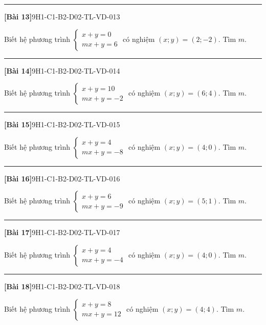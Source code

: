 \documentclass[12pt,a4paper]{article}
\newif\ifloigiai
\newenvironment{cauhoi}[2]{%
  \par\medskip\noindent\rule{\textwidth}{0.4pt}\par\nopagebreak
  \noindent\textbf{[#1]}\hfill{\scriptsize\ttfamily #2}\par\nopagebreak\smallskip}{\par}
\newcommand{\loigiai}[1]{\ifloigiai\par\smallskip\noindent\textit{Lời giải.} #1\par\fi}
\begin{document}
\begin{cauhoi}{Bài 13}{9H1-C1-B2-D02-TL-VD-013}
Biết hệ phương trình $\begin{cases}x+y=0\\ mx+y=6\end{cases}$ có nghiệm $(x;y)=(2;-2)$. Tìm $m$.
\loigiai{Thay $x=2$, $y=-2$ vào phương trình thứ hai: $2 m-2=6$ nên $m=\dfrac{6+2}{2}=4$.}
\end{cauhoi}
\begin{cauhoi}{Bài 14}{9H1-C1-B2-D02-TL-VD-014}
Biết hệ phương trình $\begin{cases}x+y=10\\ mx+y=-2\end{cases}$ có nghiệm $(x;y)=(6;4)$. Tìm $m$.
\loigiai{Thay $x=6$, $y=4$ vào phương trình thứ hai: $6 m+4=-2$ nên $m=\dfrac{-2-4}{6}=-1$.}
\end{cauhoi}
\begin{cauhoi}{Bài 15}{9H1-C1-B2-D02-TL-VD-015}
Biết hệ phương trình $\begin{cases}x+y=4\\ mx+y=-8\end{cases}$ có nghiệm $(x;y)=(4;0)$. Tìm $m$.
\loigiai{Thay $x=4$, $y=0$ vào phương trình thứ hai: $4 m+0=-8$ nên $m=\dfrac{-8-0}{4}=-2$.}
\end{cauhoi}
\begin{cauhoi}{Bài 16}{9H1-C1-B2-D02-TL-VD-016}
Biết hệ phương trình $\begin{cases}x+y=6\\ mx+y=-9\end{cases}$ có nghiệm $(x;y)=(5;1)$. Tìm $m$.
\loigiai{Thay $x=5$, $y=1$ vào phương trình thứ hai: $5 m+1=-9$ nên $m=\dfrac{-9-1}{5}=-2$.}
\end{cauhoi}
\begin{cauhoi}{Bài 17}{9H1-C1-B2-D02-TL-VD-017}
Biết hệ phương trình $\begin{cases}x+y=4\\ mx+y=-4\end{cases}$ có nghiệm $(x;y)=(4;0)$. Tìm $m$.
\loigiai{Thay $x=4$, $y=0$ vào phương trình thứ hai: $4 m+0=-4$ nên $m=\dfrac{-4-0}{4}=-1$.}
\end{cauhoi}
\begin{cauhoi}{Bài 18}{9H1-C1-B2-D02-TL-VD-018}
Biết hệ phương trình $\begin{cases}x+y=8\\ mx+y=12\end{cases}$ có nghiệm $(x;y)=(4;4)$. Tìm $m$.
\loigiai{Thay $x=4$, $y=4$ vào phương trình thứ hai: $4 m+4=12$ nên $m=\dfrac{12-4}{4}=2$.}
\end{cauhoi}
\end{document}
